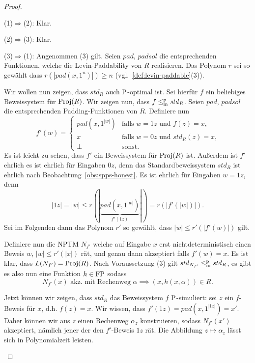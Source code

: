 \begin{proof}
\begin{prooflist}
\item (1)$\Rightarrow$(2): Klar.

\item (2)$\Rightarrow$(3): Klar.

\item (3)$\Rightarrow$(1): Angenommen (3) gilt. 
    Seien $\mathit{pad}$, $\mathit{padsol}$ die entsprechenden Funktionen, welche die Levin-Paddability von $R$ realisieren. Das Polynom $r$ sei so gewählt dass $r(|\mathit{pad}(x, 1^n)|)\geq n$ (vgl.~\ref{def:levin-paddable}(3)).

    Wir wollen nun zeigen, dass $\mathit{std}_R$ auch $\P$-optimal ist. Sei hierfür $f$ ein beliebiges Beweissystem für $\Proj(R)$. Wir zeigen nun, dass $f\leqmp \mathit{std}_R$. Seien $\mathit{pad}$, $\mathit{padsol}$ die entsprechenden Padding-Funktionen von $R$.
    Definiere nun
    \[ f'(w) = \begin{cases} \mathit{pad}(x, 1^{|w|}) & \text{falls $w=1z$ und $f(z) = x$,} \\
    x & \text{falls $w=0z$ und $\mathit{std}_R(z)=x$,} \\ \bot & \text{sonst.} \end{cases} \]
    Es ist leicht zu sehen, dass $f'$ ein Beweissystem für $\Proj(R)$ ist. Außerdem ist $f'$ ehrlich es ist ehrlich für Eingaben $0z$, denn das Standardbeweissystem $\mathit{std}_R$ ist ehrlich nach Beobachtung~\ref{obs:spps-honest}. Es ist ehrlich für Eingaben $w=1z$, denn
    \[ |1z| = |w| \leq r(|\underbrace{\mathit{pad}(x, 1^{|w|})}_{f'(1z)}|) = r(|f'(|w|)|). \]
    Sei im Folgenden dann das Polynom $r'$ so gewählt, dass $|w|\leq r'(|f'(w)|)$ gilt.

    Definiere nun die NPTM $N_{f'}$ welche auf Eingabe $x$ erst nichtdeterministisch einen Beweis $w$, $|w|\leq r'(|x|)$ rät, und genau dann akzeptiert falls $f'(w)=x$.
    Es ist klar, dass $L(N_{f'}) = \Proj(R)$.
    Nach Voraussetzung (3) gilt $\mathit{std}_{N_{f'}}\leqmp \mathit{std}_R$, es gibt es also nun eine Funktion $h\in\FP$ sodass 
    \begin{equation} N_{f'}(x) \text{ akz. mit Rechenweg $\alpha$} \implies (x,h(x,\alpha))\in R.  \label{eq:stdps-q-1}
    \end{equation}

    Jetzt können wir zeigen, dass $\mathit{std}_R$ das Beweissystem $f$ $\P$-simuliert: sei $z$ ein $f$-Beweis für $x$, d.h. $f(z)=x$.
    Wir wissen, dass $f'(1z)=\mathit{pad}(x, 1^{|1z|})=x'$.
    Daher können wir aus $z$ einen Rechenweg $\alpha_z$ konstruieren, sodass $N_{f'}(x')$ akzeptiert, nämlich jener der den $f'$-Beweis $1z$ rät.
    Die Abbildung $z\mapsto \alpha_z$ lässt sich in Polynomialzeit leisten.


\end{prooflist}
\end{proof}
